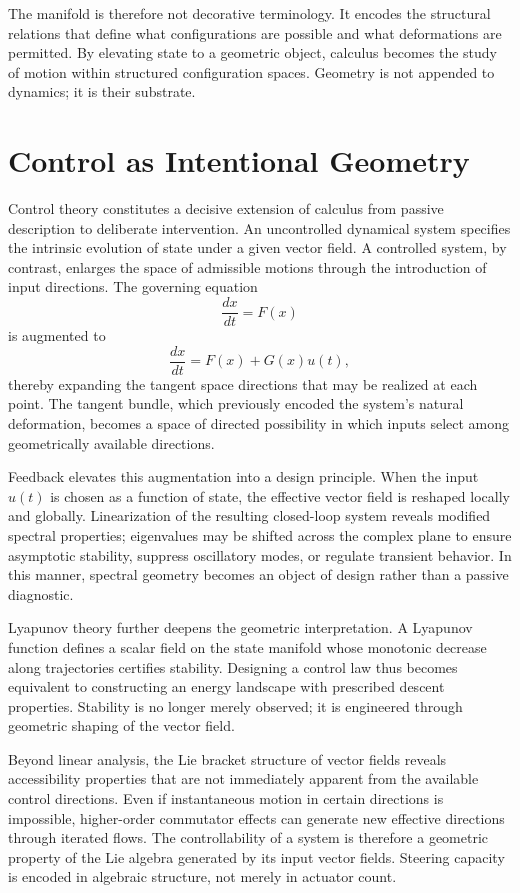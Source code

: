 \documentclass[12pt]{book}
\begin{document}
The manifold is therefore not decorative terminology. It encodes the
structural relations that define what configurations are possible and
what deformations are permitted. By elevating state to a geometric
object, calculus becomes the study of motion within structured
configuration spaces. Geometry is not appended to dynamics; it is
their substrate.

\section{Control as Intentional Geometry}

Control theory constitutes a decisive extension of calculus from
passive description to deliberate intervention. An uncontrolled
dynamical system specifies the intrinsic evolution of state under a
given vector field. A controlled system, by contrast, enlarges the
space of admissible motions through the introduction of input
directions. The governing equation
\[
\frac{dx}{dt} = F(x)
\]
is augmented to
\[
\frac{dx}{dt} = F(x) + G(x)u(t),
\]
thereby expanding the tangent space directions that may be realized at
each point. The tangent bundle, which previously encoded the system’s
natural deformation, becomes a space of directed possibility in which
inputs select among geometrically available directions.

Feedback elevates this augmentation into a design principle. When the
input $u(t)$ is chosen as a function of state, the effective vector
field is reshaped locally and globally. Linearization of the resulting
closed-loop system reveals modified spectral properties; eigenvalues
may be shifted across the complex plane to ensure asymptotic
stability, suppress oscillatory modes, or regulate transient
behavior. In this manner, spectral geometry becomes an object of
design rather than a passive diagnostic.

Lyapunov theory further deepens the geometric interpretation.
A Lyapunov function defines a scalar field on the state manifold whose
monotonic decrease along trajectories certifies stability. Designing a
control law thus becomes equivalent to constructing an energy
landscape with prescribed descent properties. Stability is no longer
merely observed; it is engineered through geometric shaping of the
vector field.

Beyond linear analysis, the Lie bracket structure of vector fields
reveals accessibility properties that are not immediately apparent
from the available control directions. Even if instantaneous motion in
certain directions is impossible, higher-order commutator effects can
generate new effective directions through iterated flows. The
controllability of a system is therefore a geometric property of the
Lie algebra generated by its input vector fields. Steering capacity is
encoded in algebraic structure, not merely in actuator count.
\end{document}
